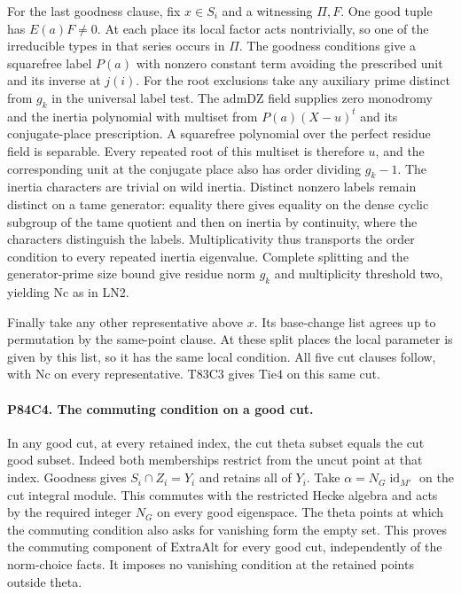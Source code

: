 For the last goodness clause, fix $x\in S_i$ and a witnessing
$\Pi,F$. One good tuple has $E(a)F\ne0$. At each place its local
factor acts nontrivially, so one of the irreducible types in that
series occurs in $\Pi$. The goodness conditions give a squarefree
label $P(a)$ with nonzero constant term avoiding the prescribed
unit and its inverse at $j(i)$. For the root exclusions take
any auxiliary prime distinct from $g_k$ in the universal label
test. The $\mathrm{admDZ}$ field supplies zero monodromy and
the inertia polynomial with multiset from $P(a)(X-u)^t$ and its
conjugate-place prescription. A squarefree polynomial over the
perfect residue field is separable. Every repeated root of this
multiset is therefore $u$, and the corresponding unit at the
conjugate place also has order dividing $g_k-1$. The inertia
characters are trivial on wild inertia. Distinct nonzero labels
remain distinct on a tame generator: equality there gives
equality on the dense cyclic subgroup of the tame quotient and
then on inertia by continuity, where the characters distinguish
the labels. Multiplicativity thus transports the order condition
to every repeated inertia eigenvalue. Complete splitting and
the generator-prime size bound give residue norm $g_k$ and
multiplicity threshold two, yielding $\mathrm{Nc}$ as in LN2.

Finally take any other representative above $x$. Its base-change
list agrees up to permutation by the same-point clause. At these
split places the local parameter is given by this list, so it has
the same local condition. All five cut clauses follow, with
$\mathrm{Nc}$ on every representative. T83C3 gives $\mathrm{Tie4}$
on this same cut.

\paragraph{P84C4. The commuting condition on a good cut.}
In any good cut, at every retained index, the cut theta subset
equals the cut good subset. Indeed both memberships restrict
from the uncut point at that index. Goodness gives
$S_i\cap Z_i=Y_i$ and retains all of $Y_i$.
Take $\alpha=N_G\operatorname{id}_{M'}$ on the cut integral module.
This commutes with the restricted Hecke algebra and acts by the
required integer $N_G$ on every good eigenspace. The theta points
at which the commuting condition also asks for vanishing form
the empty set. This proves the commuting component of
$\mathrm{ExtraAlt}$ for every good cut, independently of the
norm-choice facts. It imposes no vanishing condition at the
retained points outside theta.
